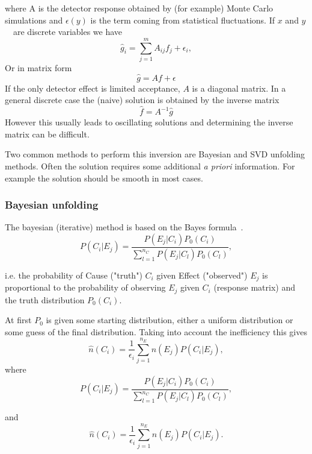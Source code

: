 \noindent where A is the detector response obtained by (for example) Monte Carlo simulations and $\epsilon(y)$ is the term coming from statistical fluctuations.
If $x$ and $y$~ are discrete variables we have
\begin{equation}
\hat g_i = \sum_{j=1}^m A_{ij}f_j+\epsilon_i,
\end{equation}
\noindent Or in matrix form
\begin{equation}
\hat g = Af+\epsilon
\end{equation}
If the only detector effect is limited acceptance, $A$ is a diagonal matrix. In a general discrete case the (naive) solution is obtained by the inverse matrix
\begin{equation}
\hat f = A^{-1}\hat g 
\end{equation}
However this usually leads to oscillating solutions and determining the inverse matrix can be difficult.

Two common methods to perform this inversion are Bayesian and SVD unfolding methods. Often the solution requires some additional {\emph{ a priori}} information. For example the solution should be smooth in most cases.

\subsubsection{Bayesian unfolding}
The bayesian (iterative) method is based on the Bayes formula~\cite{}.
$$P\left(C_i |E_j\right)=\frac{P\left(E_j |C_i\right)P_0\left(C_i\right)}{\sum_{l=1}^{n_C}P\left(E_j |C_l\right)P_0\left(C_l\right)},$$

i.e. the probability of Cause ("truth") $C_i$ given Effect ("observed") $E_j$ is proportional to the probability of observing $E_j$ given $C_i$ (response matrix) and the truth distribution $P_0\left(C_i\right)$.

At first $P_0$ is given some starting distribution, either a uniform distribution or some guess of the final distribution. Taking into account the inefficiency this gives $$\hat n\left(C_i\right) = \frac{1}{\epsilon_i} \sum_{j=1}^{n_E}n\left(E_j\right)P\left(C_i | E_j\right), $$
\noindent where 
$$P\left(C_i |E_j\right)=\frac{P\left(E_j |C_i\right)P_0\left(C_i\right)}{\sum_{l=1}^{n_C}P\left(E_j |C_l\right)P_0\left(C_l\right)},$$

\noindent and 
\begin{equation}
\hat n\left(C_i\right) = \frac{1}{\epsilon_i} \sum_{j=1}^{n_E}n\left(E_j\right)P\left(C_i | E_j\right).
\label{eq:unfolded}
\end{equation}

